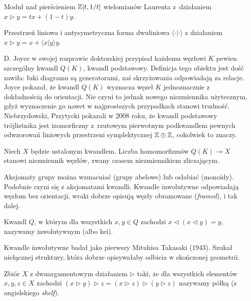 \begin{example}
    Moduł nad pierścieniem $\mathbb Z[t, 1/t]$ wielomianów Laurenta z~działaniem $x \triangleright y =tx + (1-t) y$.
\end{example}

\begin{example}
    Przestrzeń liniowa i antysymetryczna forma dwuliniowa $\langle \cdot | \cdot \rangle$ z działaniem $x \triangleright y = x + \langle x | y \rangle y$.
\end{example}

D. Joyce w swojej rozprawie doktorskiej przypisał każdemu węzłowi $K$ pewien szczególny kwandl $Q(K)$, kwandl podstawowy.
Definicja tego obiektu jest dość zawiła: łuki diagramu są generatorami, zaś skrzyżowania odpowiadają za relacje.
Joyce pokazał, że kwandl $Q(K)$ wyznacza węzeł $K$ jednoznacznie z dokładnością do orientacji.
Nie czyni to jednak nowego niezmiennika użytecznym, gdyż wyznaczenie go nawet w najprostszych przypadkach stanowi trudność.
Niebrzydowski, Przytycki pokazali w 2008 roku, że kwandl podstawowy trójlistnika jest izomorficzny z~rzutowym pierwotnym podkwandlem pewnych odwzorowań liniowych przestrzeni symplektycznej $\mathbb Z \oplus \mathbb Z$, cokolwiek to znaczy.

Niech $X$ będzie ustalonym kwandlem.
Liczba homomorfizmów $Q(K) \to X$ stanowi niezmiennik węzłów, zwany czasem niezmiennikiem zliczającym.

Aksjomaty grupy można wzmacniać (grupy abelowe) lub osłabiać (monoidy).
Podobnie czyni się z aksjomatami kwandli.
Kwandle inwolutywne odpowiadają węzłom bez orientacji, wraki dobrze opisują węzły obramowane (\emph{framed}), i tak dalej.

\begin{definition}
    Kwandl $Q$, w którym dla wszystkich $x, y \in Q$ zachodzi $x \triangleleft (x \triangleleft y) = y$, nazywamy inwolutywnym (albo kei).
\end{definition}

Kwandle inwolutywne badał jako pierwszy Mituhisa Takasaki (1943).
Szukał niełącznej struktury, która dobrze opisywałaby odbicia w skończonej geometrii.

\begin{definition}[półka]
    Zbiór $X$ z dwuargumentowym działaniem $\triangleright$ taki, że dla wszystkich elementów $x, y, z \in X$ zachodzi $(x \triangleright y) \triangleright z = (x \triangleright z) \triangleright (y \triangleright z)$ nazywamy półką (z angielskiego \emph{shelf}).
\end{definition}

